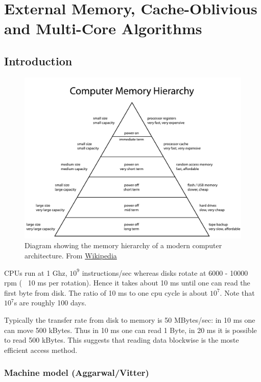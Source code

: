 \chapter{External Memory, Cache-Oblivious and Multi-Core Algorithms}

\section{Introduction}

\begin{figure}
\includegraphics{./images/ComputerMemoryHierarchy}
\caption{Diagram showing the memory hierarchy of a modern computer architecture. From \href{http://en.wikipedia.org/wiki/File:ComputerMemoryHierarchy.svg}{Wikipedia}}
\end{figure}

CPUs run at 1 Ghz, $10^9$ instructions/sec whereas disks rotate at 6000 - 10000 rpm ( ~10 ms per rotation). Hence it takes about 10 ms until one can read the first byte from disk. The ratio of 10 ms to one cpu cycle is about $10^7$. Note that $10^7$s are roughly 100 days.

Typically the transfer rate from disk to memory is 50 MBytes/sec: in 10 ms one can move 500 kBytes. Thus in 10 ms one can read 1 Byte, in 20 ms it is possible to read 500 kBytes. This  suggests that reading data blockwise is the moste efficient access method.

\subsection{Machine model (Aggarwal/Vitter)}


